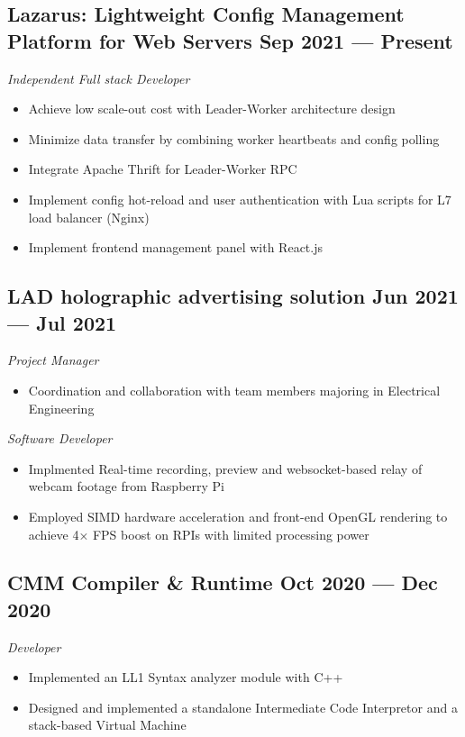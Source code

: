 \documentclass[a4,12pt]{article}
\newcommand{\subtext}[1]{
#1\par\vspace{-0.3cm}}
\newenvironment{zitemize}{
\begin{itemize}\itemsep0pt \parskip0pt \parsep1pt}
{\end{itemize}\vspace{-0.5cm}}
\begin{document}
\subsection*{Lazarus: {\normalsize\normalfont Lightweight Config Management Platform for Web Servers} \hfill \textbf{Sep 2021 --- Present}}
\subtext{\textit{Independent Full stack Developer}}
\begin{zitemize}
    \item Achieve low scale-out cost with Leader-Worker architecture design
    \item Minimize data transfer by combining worker heartbeats and config polling
    \item Integrate Apache Thrift for Leader-Worker RPC
    \item Implement config hot-reload and user authentication with Lua scripts for L7 load balancer (Nginx)
    \item Implement frontend management panel with React.js
\end{zitemize}


\subsection*{LAD holographic advertising solution \hfill \textbf{Jun 2021 --- Jul 2021}}
\subtext{\textit{Project Manager}}
\begin{zitemize}
    \item Coordination and collaboration with team members majoring in Electrical Engineering
\end{zitemize}

\vspace{0.3cm}
\subtext{\textit{Software Developer}}
\begin{zitemize}
    \item Implmented Real-time recording, preview and websocket-based relay of webcam footage from Raspberry Pi
    \item Employed SIMD hardware acceleration and front-end OpenGL rendering to achieve 4× FPS boost on RPIs with limited processing power
\end{zitemize}

\subsection*{CMM Compiler \& Runtime \hfill \textbf{Oct 2020 --- Dec 2020}}
\subtext{\textit{Developer}}
\begin{zitemize}
    \item Implemented an LL1 Syntax analyzer module with C++
    \item Designed and implemented a standalone Intermediate Code Interpretor and a stack-based Virtual Machine
\end{zitemize}
\end{document}
